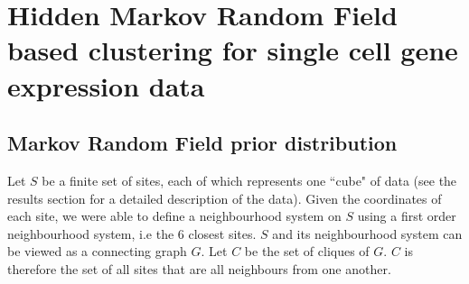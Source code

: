 \chapter{Hidden Markov Random Field based clustering for single cell gene expression data}\label{ch:clustering} 
\section{Markov Random Field prior distribution}
Let $S$ be a finite set of sites, each of which represents one ``cube" of data (see the results section for a detailed description of the data). Given the coordinates of each site, we were able to define a neighbourhood system on $S$ using a first order neighbourhood system, i.e the 6 closest sites. $S$ and its neighbourhood system can be viewed as a connecting graph $G$. Let $C$ be the set of cliques of $G$. $C$ is therefore the set of all sites that are all neighbours from one another.\\

